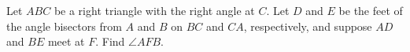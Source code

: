 Let $ABC$ be a right triangle with the right angle at $C$. Let $D$ and $E$ be the feet of the angle bisectors from $A$ and $B$ on $BC$ and $CA$, respectively, and suppose $AD$ and $BE$ meet at $F$. Find $\angle AFB$.

